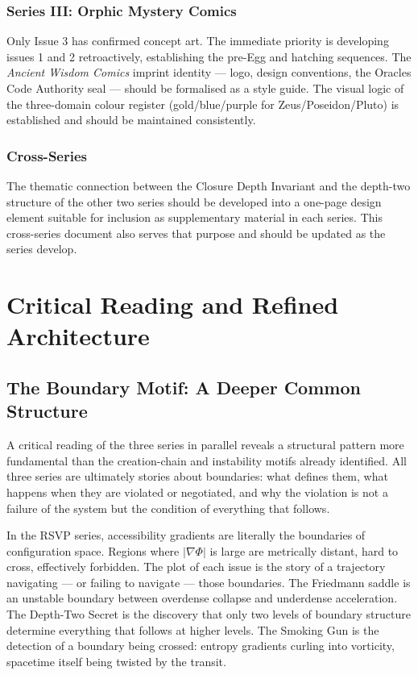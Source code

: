\documentclass[12pt, a4paper]{article}
\begin{document}
\subsubsection{Series III: Orphic Mystery Comics}

Only Issue 3 has confirmed concept art. The immediate priority is developing issues 1 and 2 retroactively, establishing the pre-Egg and hatching sequences. The \textit{Ancient Wisdom Comics} imprint identity --- logo, design conventions, the Oracles Code Authority seal --- should be formalised as a style guide. The visual logic of the three-domain colour register (gold/blue/purple for Zeus/Poseidon/Pluto) is established and should be maintained consistently.

\subsubsection{Cross-Series}

The thematic connection between the Closure Depth Invariant and the depth-two structure of the other two series should be developed into a one-page design element suitable for inclusion as supplementary material in each series. This cross-series document also serves that purpose and should be updated as the series develop.

\newpage
\section{Critical Reading and Refined Architecture}

\subsection{The Boundary Motif: A Deeper Common Structure}

A critical reading of the three series in parallel reveals a structural pattern more fundamental than the creation-chain and instability motifs already identified. All three series are ultimately stories about boundaries: what defines them, what happens when they are violated or negotiated, and why the violation is not a failure of the system but the condition of everything that follows.

In the RSVP series, accessibility gradients are literally the boundaries of configuration space. Regions where $|\nabla\Phi|$ is large are metrically distant, hard to cross, effectively forbidden. The plot of each issue is the story of a trajectory navigating --- or failing to navigate --- those boundaries. The Friedmann saddle is an unstable boundary between overdense collapse and underdense acceleration. The Depth-Two Secret is the discovery that only two levels of boundary structure determine everything that follows at higher levels. The Smoking Gun is the detection of a boundary being crossed: entropy gradients curling into vorticity, spacetime itself being twisted by the transit.
\end{document}
